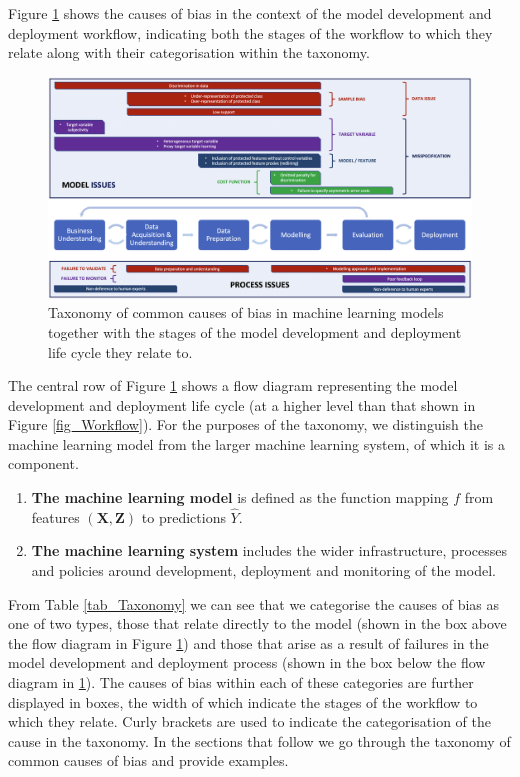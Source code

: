 Figure \ref{fig_Taxonomy} shows the causes of bias in the context of the model development and deployment workflow, indicating both the stages of the workflow to which they relate along with their categorisation within the taxonomy.
%
\begin{figure}[h!]
\centering
\includegraphics[width=\textwidth]{02_EthicalDevelopment/figures/Fig_Taxonomy.png}
\caption[Taxonomy of common causes of bias in machine learning models.]{Taxonomy of common causes of bias in machine learning models together with the stages of the model development and deployment life cycle they relate to.}
\label{fig_Taxonomy}
\end{figure}
%
The central row of Figure \ref{fig_Taxonomy} shows a flow diagram representing the model development and deployment life cycle (at a higher level than that shown in Figure \ref{fig_Workflow}). For the purposes of the taxonomy, we distinguish the machine learning model from the larger machine learning system, of which it is a component.
%
\begin{enumerate}[leftmargin=*]
\item \textbf{The machine learning model} is defined as the function mapping $f$ from features $(\boldsymbol{X}, \boldsymbol{Z})$ to predictions $\hat{Y}$.
\item \textbf{The machine learning system} includes the wider infrastructure, processes and policies around development, deployment and monitoring of the model.
\end{enumerate}
%
From Table \ref{tab_Taxonomy} we can see that we categorise the causes of bias as one of two types, those that relate directly to the model (shown in the box above the flow diagram in Figure \ref{fig_Taxonomy}) and those that arise as a result of failures in the model development and deployment process (shown in the box below the flow diagram in \ref{fig_Taxonomy}). The causes of bias within each of these categories are further displayed in boxes, the width of which indicate the stages of the workflow to which they relate. Curly brackets are used to indicate the categorisation of the cause in the taxonomy. In the sections that follow we go through the taxonomy of common causes of bias and provide examples.

